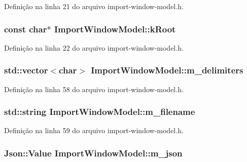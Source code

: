 Definição na linha 21 do arquivo import-\/window-\/model.\+h.

\subsubsection[{k\+Root}]{\setlength{\rightskip}{0pt plus 5cm}const char$\ast$ Import\+Window\+Model\+::k\+Root\hspace{0.3cm}{\ttfamily [static]}}\label{class_import_window_model_ada497b2fa3081d174dd2defeaf76953d}


Definição na linha 22 do arquivo import-\/window-\/model.\+h.

\subsubsection[{m\+\_\+delimiters}]{\setlength{\rightskip}{0pt plus 5cm}std\+::vector$<$char$>$ Import\+Window\+Model\+::m\+\_\+delimiters\hspace{0.3cm}{\ttfamily [protected]}}\label{class_import_window_model_a73a61fa55c53ffa5458130cbe8bccae8}


Definição na linha 58 do arquivo import-\/window-\/model.\+h.

\subsubsection[{m\+\_\+filename}]{\setlength{\rightskip}{0pt plus 5cm}std\+::string Import\+Window\+Model\+::m\+\_\+filename\hspace{0.3cm}{\ttfamily [protected]}}\label{class_import_window_model_a585fc322e320947ebc9a97cbe265faa5}


Definição na linha 59 do arquivo import-\/window-\/model.\+h.

\subsubsection[{m\+\_\+json}]{\setlength{\rightskip}{0pt plus 5cm}Json\+::\+Value Import\+Window\+Model\+::m\+\_\+json\hspace{0.3cm}{\ttfamily [protected]}}\label{class_import_window_model_a5fab576f116d351419b4e1fd6ad6d2b6}


